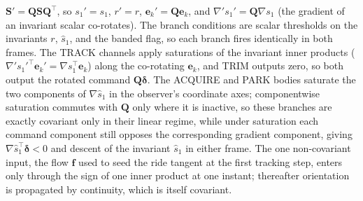 \documentclass[lettersize,journal]{IEEEtran}
\begin{document}
\begin{IEEEproof}
$\mathbf{S}' = \mathbf{Q}\mathbf{S}\mathbf{Q}^\top$, so $s_1' = s_1$,
$r' = r$, $\mathbf{e}_k' = \mathbf{Q}\mathbf{e}_k$, and $\nabla' s_1' =
\mathbf{Q}\nabla s_1$ (the gradient of an invariant scalar co-rotates).
The branch conditions are scalar thresholds on the invariants $r$,
$\hat{s}_1$, and the banded flag, so each branch fires identically in
both frames. The TRACK channels apply saturations of the invariant
inner products
($\nabla' s_1'^\top \mathbf{e}_k' = \nabla s_1^\top \mathbf{e}_k$)
along the co-rotating $\mathbf{e}_k$, and TRIM outputs zero, so both
output the rotated command $\mathbf{Q}\boldsymbol{\delta}$. The ACQUIRE
and PARK bodies saturate the two components of $\nabla\hat{s}_1$ in the
observer's coordinate axes; componentwise saturation commutes with
$\mathbf{Q}$ only where it is inactive, so these branches are exactly
covariant only in their linear regime, while under saturation each
command component still opposes the corresponding gradient component,
giving $\nabla\hat{s}_1^\top \boldsymbol{\delta} < 0$ and descent of
the invariant $\hat{s}_1$ in either frame. The one non-covariant input, the flow
$\mathbf{f}$ used to seed the ride tangent at the first tracking step,
enters only through the sign of one inner product at one instant;
thereafter orientation is propagated by continuity, which is itself
covariant.
\end{IEEEproof}
\end{document}
